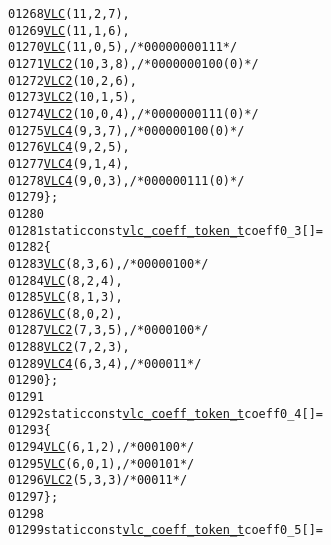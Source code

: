 \begin{footnotesize}
\begin{alltt}
01268         \hyperlink{vlc_8h_a7f3572774a720fd9b4bc3b1a0b65082f}{VLC}(11, 2, 7),
01269         \hyperlink{vlc_8h_a7f3572774a720fd9b4bc3b1a0b65082f}{VLC}(11, 1, 6),
01270         \hyperlink{vlc_8h_a7f3572774a720fd9b4bc3b1a0b65082f}{VLC}(11, 0, 5),   \textcolor{comment}{/* 0000 0000 111 */}
01271         \hyperlink{vlc_8h_ad3cda36b9c6132357c7f7de5e52a6c93}{VLC2}(10, 3, 8),  \textcolor{comment}{/* 0000 0001 00(0) */}
01272         \hyperlink{vlc_8h_ad3cda36b9c6132357c7f7de5e52a6c93}{VLC2}(10, 2, 6),
01273         \hyperlink{vlc_8h_ad3cda36b9c6132357c7f7de5e52a6c93}{VLC2}(10, 1, 5),
01274         \hyperlink{vlc_8h_ad3cda36b9c6132357c7f7de5e52a6c93}{VLC2}(10, 0, 4),  \textcolor{comment}{/* 0000 0001 11(0) */}
01275         \hyperlink{vlc_8h_a02cdc921d8f03450b12879e8afb222cb}{VLC4}(9, 3, 7),  \textcolor{comment}{/* 0000 0010 0(0) */}
01276         \hyperlink{vlc_8h_a02cdc921d8f03450b12879e8afb222cb}{VLC4}(9, 2, 5),
01277         \hyperlink{vlc_8h_a02cdc921d8f03450b12879e8afb222cb}{VLC4}(9, 1, 4),
01278         \hyperlink{vlc_8h_a02cdc921d8f03450b12879e8afb222cb}{VLC4}(9, 0, 3),  \textcolor{comment}{/* 0000 0011 1(0) */}
01279 \};
01280 
01281 \textcolor{keyword}{static} \textcolor{keyword}{const} \hyperlink{structvlc__coeff__token__t}{vlc_coeff_token_t} coeff0\_3[] = 
01282 \{
01283         \hyperlink{vlc_8h_a7f3572774a720fd9b4bc3b1a0b65082f}{VLC}(8, 3, 6),   \textcolor{comment}{/* 0000 0100 */}
01284         \hyperlink{vlc_8h_a7f3572774a720fd9b4bc3b1a0b65082f}{VLC}(8, 2, 4),
01285         \hyperlink{vlc_8h_a7f3572774a720fd9b4bc3b1a0b65082f}{VLC}(8, 1, 3),
01286         \hyperlink{vlc_8h_a7f3572774a720fd9b4bc3b1a0b65082f}{VLC}(8, 0, 2),
01287         \hyperlink{vlc_8h_ad3cda36b9c6132357c7f7de5e52a6c93}{VLC2}(7, 3, 5),  \textcolor{comment}{/* 0000 100 */}
01288         \hyperlink{vlc_8h_ad3cda36b9c6132357c7f7de5e52a6c93}{VLC2}(7, 2, 3),
01289         \hyperlink{vlc_8h_a02cdc921d8f03450b12879e8afb222cb}{VLC4}(6, 3, 4),  \textcolor{comment}{/* 0000 11 */}
01290 \};
01291 
01292 \textcolor{keyword}{static} \textcolor{keyword}{const} \hyperlink{structvlc__coeff__token__t}{vlc_coeff_token_t} coeff0\_4[] = 
01293 \{
01294         \hyperlink{vlc_8h_a7f3572774a720fd9b4bc3b1a0b65082f}{VLC}(6, 1, 2),    \textcolor{comment}{/* 0001 00 */}
01295         \hyperlink{vlc_8h_a7f3572774a720fd9b4bc3b1a0b65082f}{VLC}(6, 0, 1),    \textcolor{comment}{/* 0001 01 */}
01296         \hyperlink{vlc_8h_ad3cda36b9c6132357c7f7de5e52a6c93}{VLC2}(5, 3, 3)    \textcolor{comment}{/* 0001 1 */}
01297 \};
01298 
01299 \textcolor{keyword}{static} \textcolor{keyword}{const} \hyperlink{structvlc__coeff__token__t}{vlc_coeff_token_t} coeff0\_5[] = 

\end{alltt}
\end{footnotesize}
